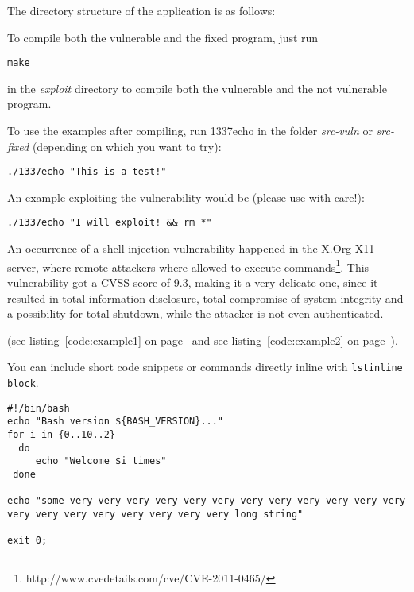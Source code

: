 \documentclass[12pt,a4paper,titlepage,oneside]{scrartcl}
\begin{document}
The directory structure of the application is as follows:


To compile both the vulnerable and the fixed program, just run

\lstinline{make}

in the \textit{exploit} directory to compile both the vulnerable and the not vulnerable program.

To use the examples after compiling, run 1337echo in the folder \textit{src-vuln} or \textit{src-fixed} (depending on which you want to try):

\lstinline{./1337echo "This is a test!"}

An example exploiting the vulnerability would be (please use with care!):

\lstinline{./1337echo "I will exploit! && rm *"}

An occurrence of a shell injection vulnerability happened in the X.Org X11 server, where remote attackers where allowed to execute commands\footnote{http://www.cvedetails.com/cve/CVE-2011-0465/}. This vulnerability got a CVSS score of 9.3, making it a very delicate one, since it resulted in total information disclosure, total compromise of system integrity and a possibility for total shutdown, while the attacker is not even authenticated.

(\hyperref[code:example1]{see listing~\ref*{code:example1} on page~\pageref*{code:example1}} and \hyperref[code:example2]{see listing~\ref*{code:example2} on page~\pageref*{code:example2}}).

You can include short code snippets or commands directly inline with \lstinline{lstinline block}.

%

\begin{lstlisting}[caption=Example bash script,label=code:example2,style=simple]
#!/bin/bash
echo "Bash version ${BASH_VERSION}..."
for i in {0..10..2}
  do
     echo "Welcome $i times"
 done

echo "some very very very very very very very very very very very very very very very very very very very very long string"

exit 0;
\end{lstlisting}
\end{document}
